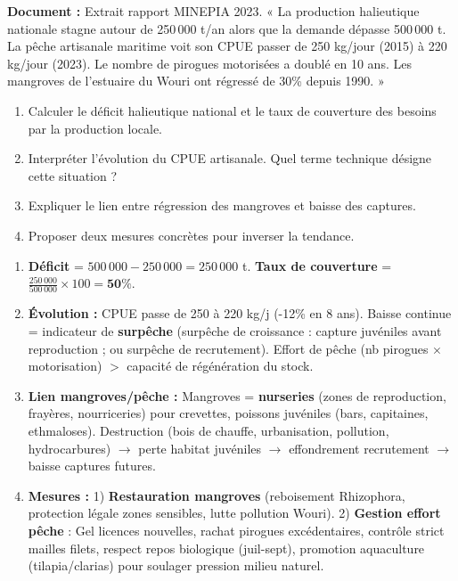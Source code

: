 \documentclass[11pt]{article}
\begin{document}
\begin{exercice}
\textbf{Document :} Extrait rapport MINEPIA 2023. « La production halieutique nationale stagne autour de 250\,000 t/an alors que la demande dépasse 500\,000 t. La pêche artisanale maritime voit son CPUE passer de 250 kg/jour (2015) à 220 kg/jour (2023). Le nombre de pirogues motorisées a doublé en 10 ans. Les mangroves de l'estuaire du Wouri ont régressé de 30\% depuis 1990. »
\begin{enumerate}
    \item Calculer le déficit halieutique national et le taux de couverture des besoins par la production locale.
    \item Interpréter l'évolution du CPUE artisanale. Quel terme technique désigne cette situation ?
    \item Expliquer le lien entre régression des mangroves et baisse des captures.
    \item Proposer deux mesures concrètes pour inverser la tendance.
\end{enumerate}
\end{exercice}

\begin{corrige}[Exercice 2]
\begin{enumerate}
    \item \textbf{Déficit} = $500\,000 - 250\,000 = 250\,000$ t. \textbf{Taux de couverture} = $\frac{250\,000}{500\,000} \times 100 = \textbf{50\%}$.
    \item \textbf{Évolution :} CPUE passe de 250 à 220 kg/j (-12\% en 8 ans). Baisse continue = indicateur de \textbf{surpêche} (surpêche de croissance : capture juvéniles avant reproduction ; ou surpêche de recrutement). Effort de pêche (nb pirogues $\times$ motorisation) $>$ capacité de régénération du stock.
    \item \textbf{Lien mangroves/pêche :} Mangroves = \textbf{nurseries} (zones de reproduction, frayères, nourriceries) pour crevettes, poissons juvéniles (bars, capitaines, ethmaloses). Destruction (bois de chauffe, urbanisation, pollution, hydrocarbures) $\to$ perte habitat juvéniles $\to$ effondrement recrutement $\to$ baisse captures futures.
    \item \textbf{Mesures :} 1) \textbf{Restauration mangroves} (reboisement Rhizophora, protection légale zones sensibles, lutte pollution Wouri). 2) \textbf{Gestion effort pêche} : Gel licences nouvelles, rachat pirogues excédentaires, contrôle strict mailles filets, respect repos biologique (juil-sept), promotion aquaculture (tilapia/clarias) pour soulager pression milieu naturel.
\end{enumerate}
\end{corrige}
\end{document}

